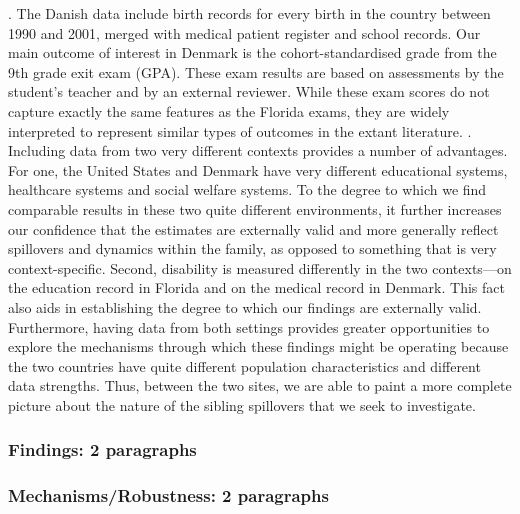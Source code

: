 {.
The Danish data include birth records for every birth in the country between 1990 and 2001, merged with medical patient register and school records. Our main outcome of interest in Denmark is the cohort-standardised grade from the 9th grade exit exam (GPA). These exam results are based on assessments by the student’s teacher and by an external reviewer. While these exam scores do not capture exactly the same features as the Florida exams, they are widely interpreted to represent similar types of outcomes in the extant literature.
.
Including data from two very different contexts provides a number of advantages. For one, the United States and Denmark have very different educational systems, healthcare systems and social welfare systems. To the degree to which we find comparable results in these two quite different environments, it further increases our confidence that the estimates are externally valid and more generally reflect spillovers and dynamics within the family, as opposed to something that is very context-specific. Second, disability is measured differently in the two contexts—on the education record in Florida and on the medical record in Denmark. This fact also aids in establishing the degree to which our findings are externally valid. Furthermore, having data from both settings provides greater opportunities to explore the mechanisms through which these findings might be operating because the two countries have quite different population characteristics and different data strengths. Thus, between the two sites, we are able to paint a more complete picture about the nature of the sibling spillovers that we seek to investigate.}



\subsubsection{Findings: 2 paragraphs}


\subsubsection{Mechanisms/Robustness: 2 paragraphs}


